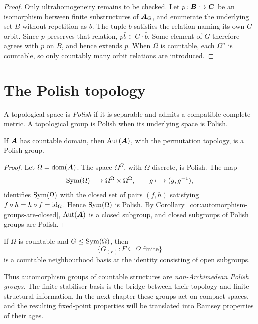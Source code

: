 \begin{proof}
    Only ultrahomogeneity remains to be checked.  Let
    \(p\colon \boldsymbol{B}\hookrightarrow \boldsymbol{C}\) be an isomorphism between finite substructures of
    \(\boldsymbol{A}_G\), and enumerate the underlying set \(B\) without repetition as \(\bar b\).  The tuple
    \(\bar b\) satisfies the relation naming its own \(G\)-orbit.  Since \(p\)
    preserves that relation, \(p\bar b\in G\cdot\bar b\).  Some element of
    \(G\) therefore agrees with \(p\) on \(B\), and hence extends \(p\).
    When \(\Omega\) is countable, each \(\Omega^n\) is countable, so only
    countably many orbit relations are introduced.
\end{proof}

\section{The Polish topology}

A topological space is \emph{Polish} if it is separable and admits a compatible
complete metric.  A topological group is Polish when its underlying space is
Polish.

\begin{theorem}
    \label{thm:aut-countable-polish}
    If \(\boldsymbol{A}\) has countable domain, then \(\operatorname{Aut}(\boldsymbol{A})\), with the permutation
    topology, is a Polish group.
\end{theorem}

\begin{proof}
    Let \(\Omega=\operatorname{dom}(\boldsymbol{A})\).  The space \(\Omega^\Omega\), with \(\Omega\)
    discrete, is Polish.  The map
    \[
        \operatorname{Sym}(\Omega)\longrightarrow\Omega^\Omega\times\Omega^\Omega,
        \qquad g\longmapsto(g,g^{-1}),
    \]
    identifies \(\operatorname{Sym}(\Omega)\) with the closed set of pairs \((f,h)\)
    satisfying \(f\circ h=h\circ f=\operatorname{id}_\Omega\).  Hence
    \(\operatorname{Sym}(\Omega)\) is Polish.  By
    Corollary~\ref{cor:automorphism-groups-are-closed}, \(\operatorname{Aut}(\boldsymbol{A})\) is a
    closed subgroup, and closed subgroups of Polish groups are Polish.
\end{proof}

\begin{proposition}
    \label{prop:countable-local-basis-open-subgroups}
    If \(\Omega\) is countable and \(G\leq\operatorname{Sym}(\Omega)\), then
    \[
        \{G_{(F)}:F\subseteq\Omega\text{ finite}\}
    \]
    is a countable neighbourhood basis at the identity consisting of open
    subgroups.
\end{proposition}

Thus automorphism groups of countable structures are
\emph{non-Archimedean Polish groups}.  The finite-stabiliser basis is the
bridge between their topology and finite structural information.  In the next
chapter these groups act on compact spaces, and the resulting fixed-point
properties will be translated into Ramsey properties of their ages.

